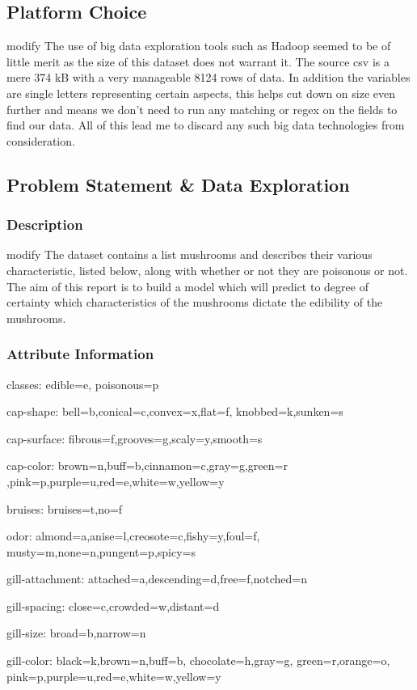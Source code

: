 \documentclass[12pt]{article}         %
\begin{document}
\subsection{Platform Choice}
modify
The use of big data exploration tools such as Hadoop seemed to be of little merit as the size of this dataset does not warrant it. The source csv is a mere 374 kB with a very manageable 8124 rows of data. In addition the variables are single letters representing certain aspects, this helps cut down on size even further and means we don't need to run any matching or regex on the fields to find our data. All of this lead me to discard any such big data technologies from consideration.
\subsection{Problem Statement \& Data Exploration}
\subsubsection{Description}
modify
The dataset contains a list mushrooms and describes their various characteristic, listed below, along with whether or not they are poisonous or not. The aim of this report is to build a model which will predict to degree of certainty which characteristics of the mushrooms dictate the edibility of the mushrooms.

\subsubsection{Attribute Information}

classes: edible=e, poisonous=p

cap-shape: bell=b,conical=c,convex=x,flat=f, knobbed=k,sunken=s

cap-surface: fibrous=f,grooves=g,scaly=y,smooth=s

cap-color: brown=n,buff=b,cinnamon=c,gray=g,green=r
,pink=p,purple=u,red=e,white=w,yellow=y

bruises: bruises=t,no=f

odor: almond=a,anise=l,creosote=c,fishy=y,foul=f,
musty=m,none=n,pungent=p,spicy=s

gill-attachment: attached=a,descending=d,free=f,notched=n

gill-spacing: close=c,crowded=w,distant=d

gill-size: broad=b,narrow=n

gill-color: black=k,brown=n,buff=b,
chocolate=h,gray=g, green=r,orange=o,
pink=p,purple=u,red=e,white=w,yellow=y
\end{document}
